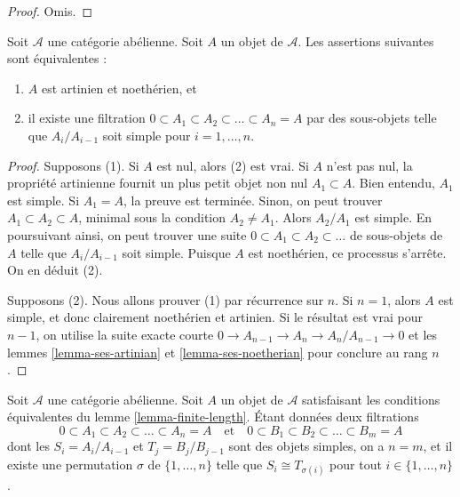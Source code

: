 \begin{proof}
Omis.
\end{proof}

\begin{lemma}
\label{lemma-finite-length}
Soit $\mathcal{A}$ une catégorie abélienne. Soit $A$ un objet
de $\mathcal{A}$. Les assertions suivantes sont équivalentes :
\begin{enumerate}
\item $A$ est artinien et noethérien, et
\item il existe une filtration
$0 \subset A_1 \subset A_2 \subset \ldots \subset A_n = A$
par des sous-objets telle que $A_i/A_{i - 1}$ soit simple pour $i = 1, \ldots, n$.
\end{enumerate}
\end{lemma}

\begin{proof}
Supposons (1). Si $A$ est nul, alors (2) est vrai. Si $A$ n'est pas nul, la propriété
artinienne fournit un plus petit objet non nul $A_1 \subset A$.
Bien entendu, $A_1$ est simple. Si $A_1 = A$, la preuve est terminée.
Sinon, on peut trouver $A_1 \subset A_2 \subset A$, minimal
sous la condition $A_2 \not = A_1$. Alors $A_2/A_1$ est simple. En poursuivant ainsi, on
peut trouver une suite $0 \subset A_1 \subset A_2 \subset \ldots$
de sous-objets de $A$ telle que $A_i/A_{i - 1}$ soit simple. Puisque $A$
est noethérien, ce processus s'arrête. On en déduit (2).

\medskip\noindent
Supposons (2). Nous allons prouver (1) par récurrence sur $n$. Si $n = 1$, alors
$A$ est simple, et donc clairement noethérien et artinien. Si le résultat est vrai
pour $n - 1$, on utilise la suite exacte courte
$0 \to A_{n - 1} \to A_n \to A_n/A_{n - 1} \to 0$
et les lemmes \ref{lemma-ses-artinian} et \ref{lemma-ses-noetherian}
pour conclure au rang $n$.
\end{proof}

\begin{lemma}
\label{lemma-jordan-holder}
Soit $\mathcal{A}$ une catégorie abélienne. Soit $A$ un objet
de $\mathcal{A}$ satisfaisant les conditions équivalentes du
lemme \ref{lemma-finite-length}. Étant données deux filtrations
$$
0 \subset A_1 \subset A_2 \subset \ldots \subset A_n = A
\quad\text{et}\quad
0 \subset B_1 \subset B_2 \subset \ldots \subset B_m = A
$$
dont les $S_i = A_i/A_{i - 1}$ et $T_j = B_j/B_{j - 1}$ sont des objets simples, on a
$n = m$, et il existe une permutation $\sigma$ de $\{1, \ldots, n\}$
telle que $S_i \cong T_{\sigma(i)}$ pour tout $i \in \{1, \ldots, n\}$.
\end{lemma}

